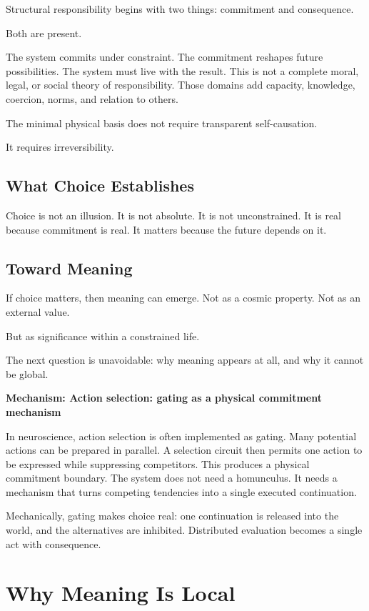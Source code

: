 \documentclass[11pt,twoside,openright]{book}
\newenvironment{mechanismbox}[1]
  {\begin{framed}\noindent\textbf{Mechanism: #1}\par\medskip}
  {\end{framed}}
\begin{document}
Structural responsibility begins with two things: commitment and consequence.

Both are present.

The system commits under constraint. The commitment reshapes future possibilities. The system must live with the result. This is not a complete moral, legal, or social theory of responsibility. Those domains add capacity, knowledge, coercion, norms, and relation to others.

The minimal physical basis does not require transparent self-causation.

It requires irreversibility.

\section*{What Choice Establishes}

Choice is not an illusion. It is not absolute. It is not unconstrained. It is real because commitment is real. It matters because the future depends on it.

\section*{Toward Meaning}

If choice matters, then meaning can emerge. Not as a cosmic property. Not as an external value.

But as significance within a constrained life.

The next question is unavoidable: why meaning appears at all, and why it cannot be global.

\begin{mechanismbox}{Action selection: gating as a physical commitment mechanism}

In neuroscience, action selection is often implemented as gating. Many potential actions can be prepared in parallel. A selection circuit then permits one action to be expressed while suppressing competitors. This produces a physical commitment boundary. The system does not need a homunculus. It needs a mechanism that turns competing tendencies into a single executed continuation.

Mechanically, gating makes choice real: one continuation is released into the world, and the alternatives are inhibited. Distributed evaluation becomes a single act with consequence.

\end{mechanismbox}
\chapter{Why Meaning Is Local}
\label{ch:meaning_is_local}
\end{document}
